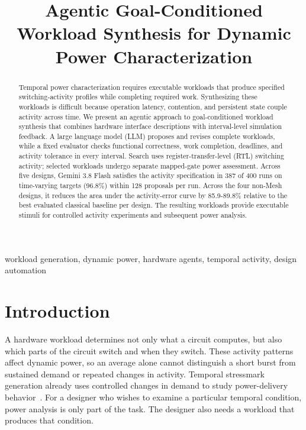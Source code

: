 \documentclass[conference]{IEEEtran}
\title{Agentic Goal-Conditioned Workload Synthesis for Dynamic Power Characterization}
\author{
\IEEEauthorblockN{Aman Desai}
\IEEEauthorblockA{
\textit{University of California, Santa Barbara} \\
Santa Barbara, CA, USA \\
amandesai@ucsb.edu
}
\and
\IEEEauthorblockN{Zishen Wan}
\IEEEauthorblockA{
\textit{Columbia University} \\
New York, NY, USA \\
zw3306@columbia.edu
}
}
\begin{document}
\IEEEoverridecommandlockouts
\IEEEaftertitletext{\vspace{-10pt}}
\maketitle
\begin{abstract}
Temporal power characterization requires executable workloads that produce
specified switching-activity profiles while completing required work.
Synthesizing these workloads is difficult because operation latency,
contention, and persistent state couple activity across time. We present an
agentic approach to goal-conditioned workload synthesis that combines hardware
interface descriptions with interval-level simulation feedback. A large language model (LLM)
proposes and revises complete workloads, while a fixed evaluator checks
functional correctness, work completion, deadlines, and activity tolerance in
every interval. Search uses register-transfer-level (RTL) switching activity; selected workloads undergo
separate mapped-gate power assessment. Across five designs, Gemini 3.8 Flash
satisfies the activity specification in 387 of 400 runs on time-varying targets
(96.8\%) within 128 proposals per run. Across the four non-Mesh designs, it
reduces the area under the activity-error curve by 85.9-89.8\% relative to the
best evaluated classical baseline per design. The resulting workloads provide
executable stimuli for controlled activity experiments and subsequent power analysis.
\end{abstract}

\begin{IEEEkeywords}
workload generation, dynamic power, hardware agents,
temporal activity, design automation
\end{IEEEkeywords}

\section{Introduction}
A hardware workload determines not only what a circuit computes, but also
which parts of the circuit switch and when they switch. These activity
patterns affect dynamic power, so an average alone cannot distinguish a short
burst from sustained demand or repeated changes in activity. Temporal
stressmark generation already uses controlled changes in demand to study
power-delivery behavior~\cite{kim,didt}. For a designer who wishes to examine
a particular temporal condition, power analysis is only part of the task.
The designer also needs a workload that produces that condition.
\end{document}
